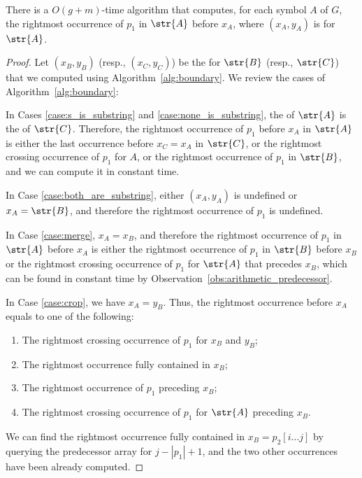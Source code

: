 \begin{proposition}\label{claim:preceding_x_A}
There is a $O(g+m)$-time algorithm that computes, for each symbol $A$ of $G$, the rightmost occurrence of $p_1$ in $\str{A}$ before $x_A$, where $(x_A,y_A)$ is  for $\str{A}$. 
\end{proposition}    
\begin{proof}   
Let $(x_B,y_B)$ (resp., $(x_C,y_C)$) be the  for $\str{B}$ (resp., $\str{C}$) that we computed using Algorithm~\ref{alg:boundary}. We review the cases of Algorithm~\ref{alg:boundary}:

In Cases \ref{case:s_is_substring} and \ref{case:none_is_substring}, the  of $\str{A}$ is the  of $\str{C}$. Therefore, the rightmost occurrence of $p_1$ before $x_A$ in $\str{A}$ is either the last occurrence before $x_C=x_A$ in $\str{C}$, or the rightmost crossing occurrence of $p_1$ for $A$, or the rightmost occurrence of $p_1$ in $\str{B}$, and we can compute it in constant time.

In Case \ref{case:both_are_substring}, either $(x_A,y_A)$ is undefined or $x_A = \str{B}$, and therefore the rightmost occurrence of $p_1$ is undefined. 

In Case \ref{case:merge}, $x_A=x_B$, and therefore the rightmost occurrence of $p_1$ in $\str{A}$ before $x_A$ is either the rightmost occurrence of $p_1$ in $\str{B}$ before $x_B$ or the rightmost crossing occurrence of $p_1$ for $\str{A}$ that precedes $x_B$, which can be found in constant time by Observation~\ref{obs:arithmetic_predecessor}. 

In Case \ref{case:crop}, we have $x_A=y_B$. Thus, the rightmost occurrence before $x_A$ equals to one of the following: 
        \begin{enumerate}
            \item The rightmost crossing occurrence of $p_1$ for $x_B$ and $y_B$; 
            \item The rightmost occurrence fully contained in $x_B$; 
            \item The rightmost occurrence of $p_1$ preceding $x_B$;
            \item The rightmost crossing occurrence of $p_1$ for $\str{A}$ preceding $x_B$.
        \end{enumerate}
We can find the rightmost occurrence fully contained in $x_B=p_2[i \dots j]$ by querying the predecessor array for $j-|p_1|+1$, and the two other occurrences have been already computed. 

\end{proof}
    
